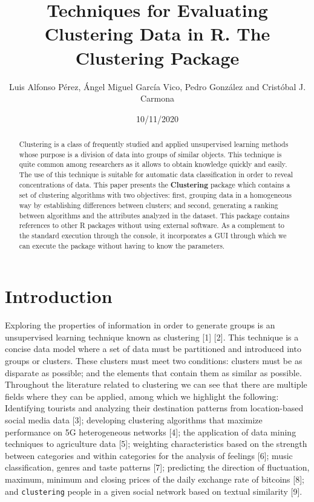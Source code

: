 \documentclass[
]{article}
\title{Techniques for Evaluating Clustering Data in R. The
\textbf{Clustering} Package}
\author{Luis Alfonso Pérez, Ángel Miguel García Vico, Pedro González and
Cristóbal J. Carmona}
\date{10/11/2020}
\begin{document}
\maketitle
\begin{abstract}
Clustering is a class of frequently studied and applied unsupervised
learning methods whose purpose is a division of data into groups of
similar objects. This technique is quite common among researchers as it
allows to obtain knowledge quickly and easily. The use of this technique
is suitable for automatic data classification in order to reveal
concentrations of data. This paper presents the \textbf{Clustering}
package which contains a set of clustering algorithms with two
objectives: first, grouping data in a homogeneous way by establishing
differences between clusters; and second, generating a ranking between
algorithms and the attributes analyzed in the dataset. This package
contains references to other R packages without using external software.
As a complement to the standard execution through the console, it
incorporates a GUI through which we can execute the package without
having to know the parameters.
\end{abstract}

\hypertarget{introduction}{%
\section{Introduction}\label{introduction}}

Exploring the properties of information in order to generate groups is
an unsupervised learning technique known as clustering {[}1{]} {[}2{]}.
This technique is a concise data model where a set of data must be
partitioned and introduced into groups or clusters. These clusters must
meet two conditions: clusters must be as disparate as possible; and the
elements that contain them as similar as possible. Throughout the
literature related to clustering we can see that there are multiple
fields where they can be applied, among which we highlight the
following: Identifying tourists and analyzing their destination patterns
from location-based social media data {[}3{]}; developing clustering
algorithms that maximize performance on 5G heterogeneous networks
{[}4{]}; the application of data mining techniques to agriculture data
{[}5{]}; weighting characteristics based on the strength between
categories and within categories for the analysis of feelings {[}6{]};
music classification, genres and taste patterns {[}7{]}; predicting the
direction of fluctuation, maximum, minimum and closing prices of the
daily exchange rate of bitcoins {[}8{]}; and \texttt{clustering} people
in a given social network based on textual similarity {[}9{]}.
\end{document}
